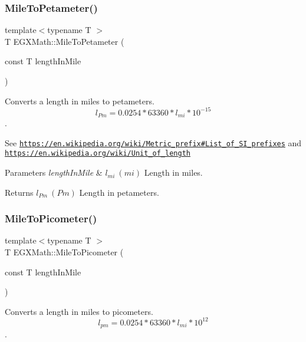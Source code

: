 \subsubsection{\texorpdfstring{Mile\+To\+Petameter()}{MileToPetameter()}}
{\footnotesize\ttfamily template$<$typename T $>$ \\
T E\+G\+X\+Math\+::\+Mile\+To\+Petameter (\begin{DoxyParamCaption}\item[{const T}]{length\+In\+Mile }\end{DoxyParamCaption})}



Converts a length in miles to petameters. \[ l_{Pm}=0.0254 * 63360 * l_{mi} * 10^{-15} \]. 

See \href{https://en.wikipedia.org/wiki/Metric_prefix#List_of_SI_prefixes}{\tt https\+://en.\+wikipedia.\+org/wiki/\+Metric\+\_\+prefix\#\+List\+\_\+of\+\_\+\+S\+I\+\_\+prefixes} and \href{https://en.wikipedia.org/wiki/Unit_of_length}{\tt https\+://en.\+wikipedia.\+org/wiki/\+Unit\+\_\+of\+\_\+length} 
\begin{DoxyParams}{Parameters}
{\em length\+In\+Mile} & $ l_{mi}\ (mi)$ Length in miles. \\
\hline
\end{DoxyParams}
\begin{DoxyReturn}{Returns}
$ l_{Pm}\ (Pm)$ Length in petameters. 
\end{DoxyReturn}
\mbox{\label{group___e_g_x_math-_conversions-_length_conversions-_imperial-_mile-_s_i_ga470a1271de988c28cb4851e5930d99da}} 
\subsubsection{\texorpdfstring{Mile\+To\+Picometer()}{MileToPicometer()}}
{\footnotesize\ttfamily template$<$typename T $>$ \\
T E\+G\+X\+Math\+::\+Mile\+To\+Picometer (\begin{DoxyParamCaption}\item[{const T}]{length\+In\+Mile }\end{DoxyParamCaption})}



Converts a length in miles to picometers. \[ l_{pm}=0.0254 * 63360 * l_{mi} * 10^{12} \]. 

